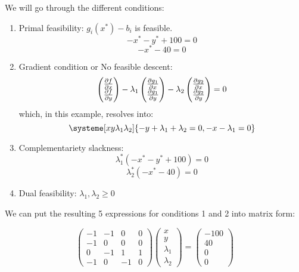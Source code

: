 We will go through the different conditions:

\begin{enumerate}
  \item Primal feasibility:  $g_i(x^*)-b_i$ is feasible. 
  \[-x^* -y^* +100 =0\]
  \[-x^*-40=0\]
  \item Gradient condition or No feasible descent:  
  \[ \begin{pmatrix}\pdv{f}{x}\\\pdv{f}{y}\end{pmatrix} 
  -\lambda_1 \begin{pmatrix}\pdv{g_1}{x}\\\pdv{g_1}{y}\end{pmatrix}
  -\lambda_2 \begin{pmatrix}\pdv{g_2}{x}\\\pdv{g_2}{y}\end{pmatrix} =0\]
  which, in this example, resolves into:
  \[\systeme[xy\lambda_1\lambda_2]{-y+\lambda_1+\lambda_2=0,-x-\lambda_1=0 }\]
  \item Complementariety slackness: 
  \[\lambda_1^* (-x^* -y^* +100)=0\]
  \[\lambda_2^* (-x^*-40)=0\]
  \item Dual feasibility: $\lambda_1,\lambda_2\geq 0$
\end{enumerate}

We can put the resulting 5 expressions for conditions 1 and 2 into matrix form:

\[
  \begin{pmatrix} -1 & -1 & 0&0\\ -1&0&0&0\\ 0&-1&1&1\\ -1&0&-1&0 \end{pmatrix}
  \begin{pmatrix} x\\y\\\lambda_1\\\lambda_2\end{pmatrix}=
  \begin{pmatrix} -100\\ 40\\0\\0 \end{pmatrix}
\]

